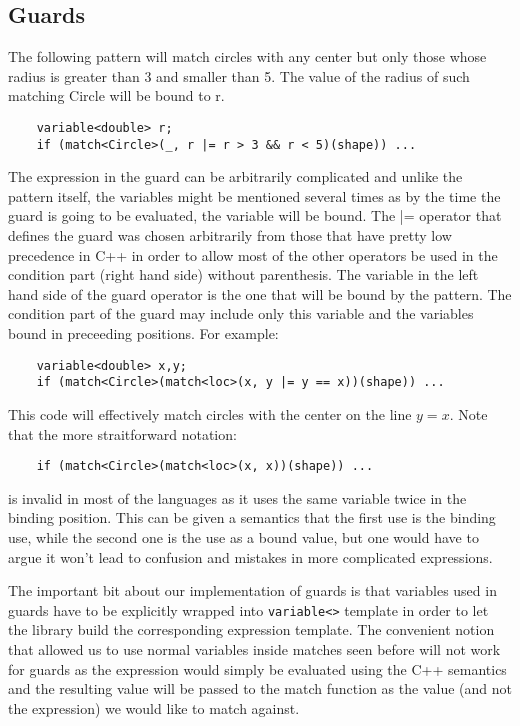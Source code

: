 \documentclass[submission,copyright]{eptcs}
\DeclareRobustCommand{\code}[1]{{\lstinline[breaklines=false]{#1}}}
\begin{document}
\subsection{Guards}

The following pattern will match circles with any center but only those whose 
radius is greater than 3 and smaller than 5. The value of the radius of such 
matching Circle will be bound to r.

\begin{lstlisting}
    variable<double> r;
    if (match<Circle>(_, r |= r > 3 && r < 5)(shape)) ...
\end{lstlisting}

The expression in the guard can be arbitrarily complicated and unlike the 
pattern itself, the variables might be mentioned several times as by the time 
the guard is going to be evaluated, the variable will be bound. The |= operator 
that defines the guard was chosen arbitrarily from those that have pretty low 
precedence in C++ in order to allow most of the other operators be used in the 
condition part (right hand side) without parenthesis. The variable in the left 
hand side of the guard operator is the one that will be bound by the pattern. 
The condition part of the guard may include only this variable and the variables 
bound in preceeding positions. For example:

\begin{lstlisting}
    variable<double> x,y;
    if (match<Circle>(match<loc>(x, y |= y == x))(shape)) ...
\end{lstlisting}

This code will effectively match circles with the center on the line $y=x$. Note 
that the more straitforward notation:

\begin{lstlisting}
    if (match<Circle>(match<loc>(x, x))(shape)) ...
\end{lstlisting}

is invalid in most of the languages as it uses the same variable twice in the 
binding position. This can be given a semantics that the first use is the 
binding use, while the second one is the use as a bound value, but one would 
have to argue it won't lead to confusion and mistakes in more complicated 
expressions.

The important bit about our implementation of guards is that variables used in 
guards have to be explicitly wrapped into \code{variable<>} template in order to let 
the library build the corresponding expression template. The convenient notion 
that allowed us to use normal variables inside matches seen before will not work 
for guards as the expression would simply be evaluated using the C++ semantics 
and the resulting value will be passed to the match function as the value (and 
not the expression) we would like to match against.
\end{document}
